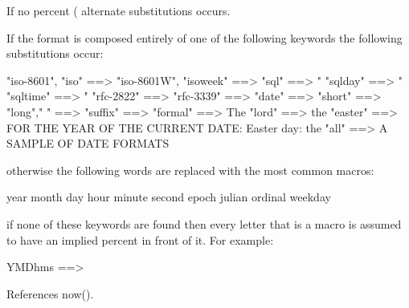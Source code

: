 \begin{DoxyVerb}
If no percent (%
alternate substitutions occurs.

If the format is composed entirely of one of the following
keywords the following substitutions occur:

  "iso-8601",
  "iso"        ==> %
  "iso-8601W",
  "isoweek"    ==> %
  "sql"        ==> "%
  "sqlday"     ==> "%
  "sqltime"    ==> "%
  "rfc-2822"   ==> %
  "rfc-3339"   ==> %
  "date"       ==> %
  "short"      ==> %
  "long"," "   ==> %
  "suffix"     ==> %
  "formal"     ==> The %
  "lord"       ==> the %
  "easter"     ==> FOR THE YEAR OF THE CURRENT DATE:
                   Easter day: the %
  "all"        ==> A SAMPLE OF DATE FORMATS

otherwise the following words are replaced with the most
common macros:

   year     %
   month    %
   day      %
   hour     %
   minute   %
   second   %
   epoch    %
   julian   %
   ordinal  %
   weekday  %

if none of these keywords are found then every letter that
is a macro is assumed to have an implied percent in front
of it. For example:

   YMDhms ==> %
 

References now().


\end{DoxyVerb}

